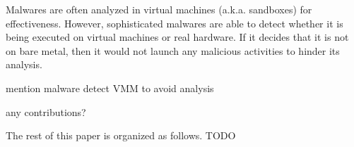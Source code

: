 Malwares are often analyzed in virtual machines (a.k.a. sandboxes) for effectiveness. However, sophisticated malwares are able to detect whether it is being executed on virtual machines or real hardware. If it decides that it is not on bare metal, then it would not launch any malicious activities to hinder its analysis.

mention malware detect VMM to avoid analysis

any contributions?

The rest of this paper is organized as follows. TODO

